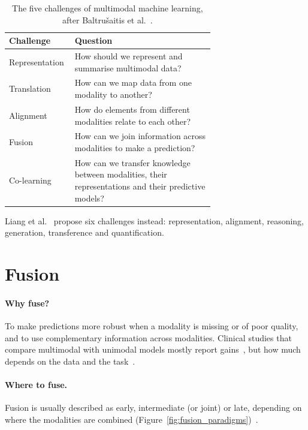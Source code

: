 \begin{table}[htbp]
  \centering
  \begin{tabular}{@{}lp{0.68\linewidth}@{}}
    \toprule
    Challenge      & Question \\
    \midrule
    Representation & How should we represent and summarise multimodal data? \\
    Translation    & How can we map data from one modality to another? \\
    Alignment      & How do elements from different modalities relate to each other? \\
    Fusion         & How can we join information across modalities to make a prediction? \\
    Co-learning    & How can we transfer knowledge between modalities, their
                     representations and their predictive models? \\
    \bottomrule
  \end{tabular}
  \caption{The five challenges of multimodal machine learning, after
           Baltru\v{s}aitis et al.~\cite{baltrusaitis2019multimodal}.}
  \label{tab:challenges}
\end{table}

\begin{furtherreading}
  \item Liang et al.~\cite{liang2024foundations} propose six challenges instead:
        representation, alignment, reasoning, generation, transference and
        quantification.
\end{furtherreading}


\section{Fusion}
\label{sec:fusion}

\paragraph{Why fuse?} To make predictions more robust when a modality is missing
or of poor quality, and to use complementary information across modalities.
Clinical studies that compare multimodal with unimodal models mostly report
gains~\cite{kline2022multimodal}, but how much depends on the data and the
task~\cite{krones2025review}.

\paragraph{Where to fuse.} Fusion is usually described as early, intermediate (or
joint) or late, depending on where the modalities are combined
(Figure~\ref{fig:fusion_paradigms})~\cite{huang2020fusion,krones2025review}.

